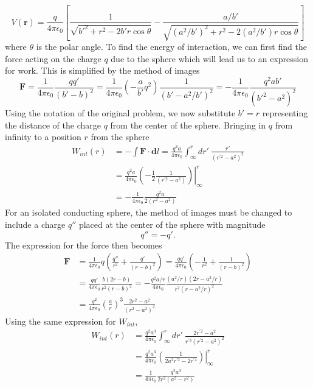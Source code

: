 \documentclass[11pt,letterpaper]{article}
\newcommand{\vect}[1]{\mathbf{#1}}
\begin{document}
\begin{enumerate}
\begin{equation}V(\vect r) = \frac{q}{4\pi\epsilon_0}\left[\frac{1}{\sqrt{b'^2+r^2-2b'r\cos\theta}}-\frac{a/b'}{\sqrt{(a^2/b')^2+r^2-2(a^2/b')r\cos\theta}}\right]\end{equation}
where $\theta$ is the polar angle. To find the energy of interaction, we can first find the force acting on the charge $q$ due to the sphere which will lead us to an expression for work. This is simplified by the method of images
$$\vect F = \frac{1}{4\pi\epsilon_0}\frac{qq'}{(b'-b)^2}=\frac{1}{4\pi\epsilon_0}\left(-\frac{a}{b'}q^2\right)\frac{1}{(b'-a^2/b')^2}=-\frac{1}{4\pi\epsilon_0}\frac{q^2ab'}{(b'^2-a^2)^2}$$
Using the notation of the original problem, we now substitute $b'=r$ representing the distance of the charge $q$ from the center of the sphere. Bringing in $q$ from infinity to a position $r$ from the sphere
\begin{align*}W_{int}(r) &= -\int{\vect F\cdot \vect dl}=\frac{q^2a}{4\pi\epsilon_0}\int_{\infty}^{r}{dr'\ \frac{r'}{(r^{'2}-a^2)^2}}\\
&=\frac{q^2a}{4\pi\epsilon_0}\left.\left(-\frac{1}{2}\frac{1}{(r^{'2}-a^2)}\right)\right|^r_\infty \\&= -\frac{1}{4\pi\epsilon_0}\frac{q^2a}{2(r^2-a^2)}
\end{align*}
For an isolated conducting sphere, the method of images must be changed to include a charge $q''$ placed at the center of the sphere with magnitude 
$$q'' = -q'.$$ The expression for the force then becomes 
\begin{align*} \vect F &= \frac{1}{4\pi\epsilon_0}q\left(\frac{q''}{r^2}+\frac{q'}{(r-b)^2}\right) =\frac{qq'}{4\pi\epsilon_0}\left(-\frac{1}{r^2}+\frac{1}{(r-b)^2}\right)
\\&= \frac{qq'}{4\pi\epsilon_0}\frac{b(2r-b)}{r^2(r-b)^2} = -\frac{q^2a/r}{4\pi\epsilon_0}\frac{(a^2/r)(2r-a^2/r)}{r^2(r-a^2/r)^2}\\
&=\frac{q^2}{4\pi\epsilon_0}\left(\frac{a}{r}\right)^3\frac{2r^2-a^2}{(r^2-a^2)^2} 
\end{align*}
Using the same expression for $W_{int}$,
\begin{align*}W_{int}(r) &= \frac{q^2a^3}{4\pi\epsilon_0}\int_{\infty}^{r}{dr'\ \frac{2r^{'2}-a^2}{r^{'3}(r^{'2}-a^2)^2}}\\
&=\frac{q^2a^3}{4\pi\epsilon_0}\left.\left(\frac{1}{2a^2r^{'2}-2r^{'4}}\right)\right|^r_\infty 
\\&= \frac{1}{4\pi\epsilon_0}\frac{q^2a^3}{2r^2(a^2-r^2)}
\end{align*}


\end{enumerate}
\end{document}
